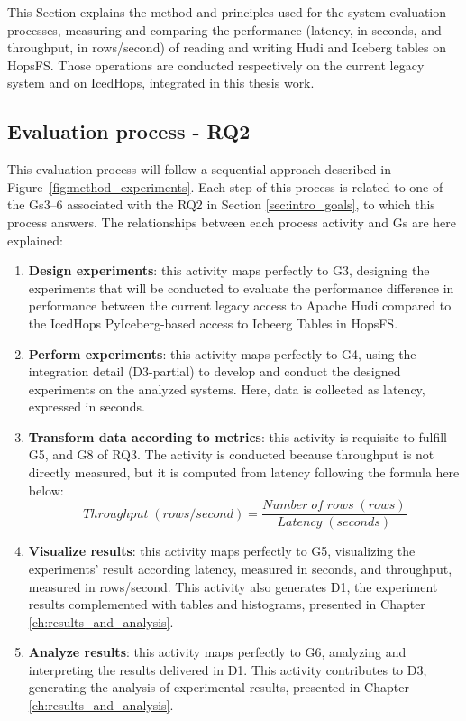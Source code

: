 This Section explains the method and principles used for the system evaluation processes, measuring and comparing the performance (latency, in seconds, and throughput, in rows/second) of reading and writing Hudi and Iceberg tables on \gls{HopsFS}. Those operations are conducted respectively on the current legacy system and on IcedHops, integrated in this thesis work.

\subsection{Evaluation process - RQ2}
\label{subsec:eval_process_hudi_iceberg}
This evaluation process will follow a sequential approach described in Figure~\ref{fig:method_experiments}. Each step of this process is related to one of the \glspl{G}3--6 associated with the \gls{RQ}2 in Section \ref{sec:intro_goals}, to which this process answers. The relationships between each process activity and \glspl{G} are here explained:
\begin{enumerate}
    \item \textbf{Design experiments}: this activity maps perfectly to \gls{G}3, designing the experiments that will be conducted to evaluate the performance difference in performance between the current legacy access to Apache Hudi compared to the IcedHops PyIceberg-based access to Icbeerg Tables in \gls{HopsFS}. 
    \item \textbf{Perform experiments}: this activity maps perfectly to \gls{G}4, using the integration detail (\gls{D}3-partial) to develop and conduct the designed experiments on the analyzed systems. Here, data is collected as latency, expressed in seconds.
    \item \textbf{Transform data according to metrics}: this activity is requisite to fulfill \gls{G}5, and \gls{G}8 of \gls{RQ}3. The activity is conducted because throughput is not directly measured, but it is computed from latency following the formula here below:
    \[ Throughput \; (rows/second) = \frac{Number \; of \; rows \; (rows)}{Latency \;(seconds)}\]
    \item \textbf{Visualize results}: this activity maps perfectly to \gls{G}5, visualizing the experiments' result according latency, measured in seconds, and throughput, measured in rows/second. This activity also generates \gls{D}1, the experiment results complemented with tables and histograms, presented in Chapter \ref{ch:results_and_analysis}.
    \item \textbf{Analyze results}: this activity maps perfectly to \gls{G}6, analyzing and interpreting the results delivered in \gls{D}1. This activity contributes to \gls{D}3, generating the analysis of experimental results, presented in Chapter \ref{ch:results_and_analysis}.
\end{enumerate}
